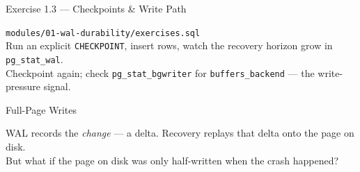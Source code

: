 \documentclass[aspectratio=169,10pt]{beamer}
\begin{document}
\begin{frame}{Exercise 1.3 --- Checkpoints \& Write Path}

  \begin{block}{}
    \faTerminal\enspace\texttt{modules/01-wal-durability/exercises.sql}\\[0.5em]
    Run an explicit \texttt{CHECKPOINT}, insert rows, watch the recovery
    horizon grow in \texttt{pg\_stat\_wal}.\\[0.3em]
    Checkpoint again; check \texttt{pg\_stat\_bgwriter} for
    \texttt{buffers\_backend} --- the write-pressure signal.
  \end{block}

\end{frame}

\begin{frame}{Full-Page Writes}

  \begin{block}{}
    WAL records the \textit{change} --- a delta.  Recovery replays
    that delta onto the page on disk.\\[0.4em]
    But what if the page on disk was only half-written when the
    crash happened?
  \end{block}

\end{frame}
\end{document}
